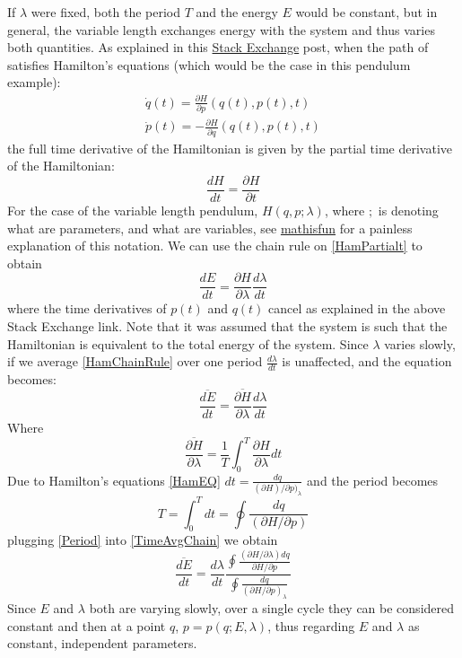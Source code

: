\documentclass[12pt]{article}
\begin{document}
If $\lambda$ were fixed, both the period $T$ and the energy $E$ would be constant, but in general, the variable length exchanges energy with the system and thus varies both quantities. As explained in this \href{https://physics.stackexchange.com/questions/83541/when-does-the-total-time-derivative-of-the-hamiltonian-equal-its-partial-time-de}{Stack Exchange} post, when the path of satisfies Hamilton's equations (which would be the case in this pendulum example):
\begin{equation}\label{HamEQ}
\begin{split}
\dot{q}(t)=\frac{\partial H}{\partial p}(q(t),p(t),t)\\
\dot{p}(t)=-\frac{\partial H}{\partial q}(q(t),p(t),t)
\end{split}
\end{equation}
the full time derivative of the Hamiltonian is given by the partial time derivative of the Hamiltonian:
\begin{equation}\label{HamPartialt}
\frac{d H}{dt}=\frac{\partial H}{\partial t}
\end{equation}
For the case of the variable length pendulum, $H(q,p;\lambda)$, where $;$ is denoting what are parameters, and what are variables, see \href{https://www.mathsisfun.com/definitions/parameter.html}{mathisfun} for a painless explanation of this notation. We can use the chain rule on \eqref{HamPartialt} to obtain
\begin{equation}\label{HamChainRule}
\frac{dE}{dt}=\frac{\partial H}{\partial \lambda}\frac{d\lambda}{dt}
\end{equation}
where the time derivatives of $p(t)$ and $q(t)$ cancel as explained in the above Stack Exchange link. Note that it was assumed that the system is such that the Hamiltonian is equivalent to the total energy of the system. Since $\lambda$ varies slowly, if we average \ref{HamChainRule} over one period $\frac{d\lambda}{dt}$ is unaffected, and the equation becomes:
\begin{equation}\label{TimeAvgChain}
\overline{\frac{dE}{dt}}=\overline{\frac{\partial H}{\partial \lambda}}\frac{d\lambda}{dt}
\end{equation}
Where
\begin{equation}\label{TimeAvgHam}
\overline{\frac{\partial H}{\partial \lambda}}=\frac{1}{T}\int_0^T\frac{\partial H}{\partial\lambda}dt
\end{equation}
Due to Hamilton's equations \eqref{HamEQ} $dt=\frac{dq}{(\partial H)/\partial p)_{\lambda}}$ and the period becomes
\begin{equation}\label{Period}
T=\int_0^Tdt=\oint \frac{dq}{(\partial H/\partial p)}
\end{equation}
plugging \eqref{Period} into \eqref{TimeAvgChain} we obtain
\begin{equation}\label{TimeAvgChainInt}
\overline{\frac{dE}{dt}}=\frac{d\lambda}{dt}\frac{\oint \frac{(\partial H/\partial\lambda)dq}{\partial H/\partial p}}{\oint\frac{dq}{(\partial H/\partial p)_{\lambda}}}
\end{equation}
Since $E$ and $\lambda$ both are varying slowly, over a single cycle they can be considered constant and then at a point $q$, $p=p(q;E,\lambda)$, thus regarding $E$ and $\lambda$ as constant, independent parameters.
\end{document}

